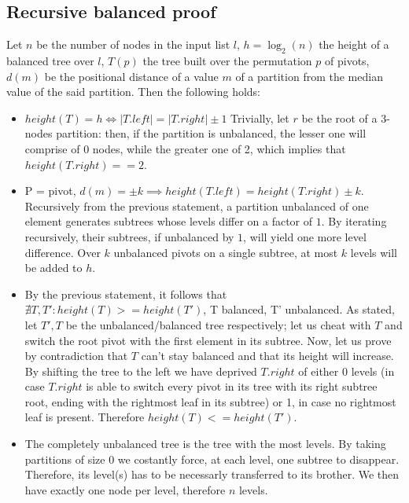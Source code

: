\documentclass{article}
\begin{document}
\subsection{Recursive balanced proof}

Let $n$ be the number of nodes in the input list $l$, $h = \log_2(n)$ the height
of a balanced tree over $l$, $T(p)$ the tree built over the permutation $p$ of pivots,
$d(m)$ be the positional distance of a value $m$ of a partition from the median
value of the said partition.
Then the following holds:

    \begin{itemize}
    \item $height(T) = h \iff |T.left| = |T.right| \pm 1$ Trivially, let $r$ be
    the root  of a 3-nodes partition: then, if the partition is unbalanced, the
    lesser one will comprise of 0 nodes, while the greater one of 2, which implies
    that $height(T.right) == 2$.
    \label{k_distance} \item P = pivot,
    $d(m) = \pm k \implies height(T.left) = height(T.right) \pm k$.
    Recursively from the previous statement, a partition unbalanced of one element
    generates subtrees whose levels differ on a factor of $1$.
    By iterating recursively, their subtrees, if unbalanced by $1$, will yield
    one more level difference.
    Over $k$ unbalanced pivots on a single subtree, at most $k$ levels will be
    added to $h$.
    \item By the previous statement, it follows that $\nexists T, T': height(T) >= height(T')$,
    T balanced, T' unbalanced.
    As stated, let $T', T$ be the unbalanced/balanced tree respectively; let us
    cheat with $T$ and switch the root pivot with the first element in its subtree.
    Now, let us prove by contradiction that $T$ can't stay balanced and that its
    height will increase.
    By shifting the tree to the left we have deprived $T.right$ of either 0 levels
    (in case $T.right$ is able to switch every pivot in its tree with its right
    subtree root, ending with the rightmost leaf in its subtree) or 1, in case no
    rightmost leaf is present.
    Therefore $height(T) <= height(T')$.
    \item The completely unbalanced tree is the tree with the most levels.
    By taking partitions of size 0 we costantly force, at each level, one subtree
    to disappear.
    Therefore, its level(s) has to be necessarly transferred to its brother.
    We then have exactly one node per level, therefore $n$ levels.
    \end{itemize}
\end{document}

